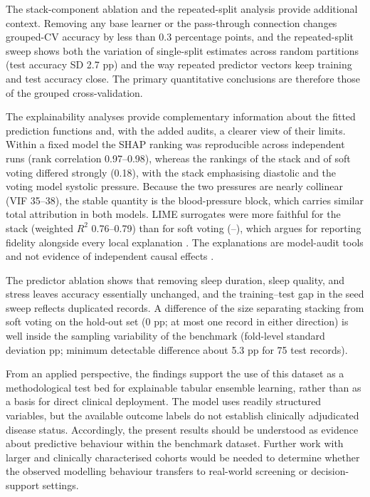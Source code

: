 \documentclass[a4paper,fleqn]{cas-dc}
\begin{document}
The stack-component ablation and the repeated-split analysis provide additional context. Removing any base learner or the pass-through connection changes grouped-CV accuracy by less than 0.3 percentage points, and the repeated-split sweep shows both the variation of single-split estimates across random partitions (test accuracy SD 2.7 pp) and the way repeated predictor vectors keep training and test accuracy close. The primary quantitative conclusions are therefore those of the grouped cross-validation.


The explainability analyses provide complementary information about the fitted prediction functions and, with the added audits, a clearer view of their limits. Within a fixed model the SHAP ranking was reproducible across independent runs (rank correlation 0.97--0.98), whereas the rankings of the stack and of soft voting differed strongly (0.18), with the stack emphasising diastolic and the voting model systolic pressure. Because the two pressures are nearly collinear (VIF 35--38), the stable quantity is the blood-pressure block, which carries similar total attribution in both models. LIME surrogates were more faithful for the stack (weighted $R^2$ 0.76--0.79) than for soft voting (\LimeRsqVoteMin--\LimeRsqVoteMax), which argues for reporting fidelity alongside every local explanation \cite{kumar2020}. The explanations are model-audit tools and not evidence of independent causal effects \cite{jung2023,rudin2019}.

The predictor ablation shows that removing sleep duration, sleep quality, and stress leaves accuracy essentially unchanged, and the training--test gap in the seed sweep reflects duplicated records. A difference of the size separating stacking from soft voting on the hold-out set (0 pp; at most one record in either direction) is well inside the sampling variability of the benchmark (fold-level standard deviation \FoldSDStackG{} pp; minimum detectable difference about 5.3 pp for 75 test records).

From an applied perspective, the findings support the use of this dataset as a methodological test bed for explainable tabular ensemble learning, rather than as a basis for direct clinical deployment. The model uses readily structured variables, but the available outcome labels do not establish clinically adjudicated disease status. Accordingly, the present results should be understood as evidence about predictive behaviour within the benchmark dataset. Further work with larger and clinically characterised cohorts would be needed to determine whether the observed modelling behaviour transfers to real-world screening or decision-support settings.
\end{document}
